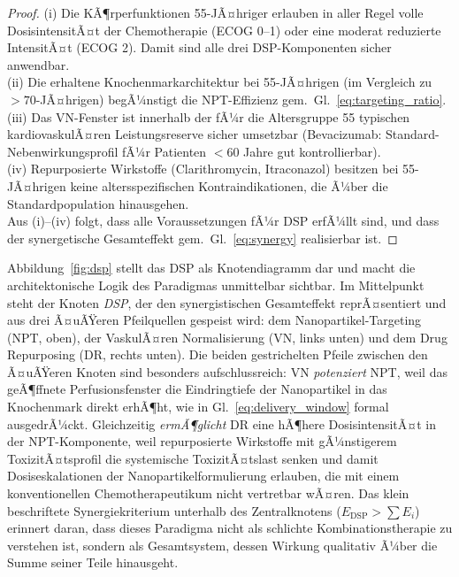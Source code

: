 ﻿\documentclass[12pt,a4paper]{article}
\theoremstyle{definition}
\begin{document}
\begin{proof}
  (i) Die KÃ¶rperfunktionen 55-JÃ¤hriger erlauben in aller Regel volle DosisintensitÃ¤t
  der Chemotherapie (ECOG 0--1) oder eine moderat reduzierte IntensitÃ¤t (ECOG 2).
  Damit sind alle drei DSP-Komponenten sicher anwendbar.\\
  (ii) Die erhaltene Knochenmarkarchitektur bei 55-JÃ¤hrigen (im Vergleich zu
  $>70$-JÃ¤hrigen) begÃ¼nstigt die NPT-Effizienz gem.\ Gl.~\eqref{eq:targeting_ratio}.\\
  (iii) Das VN-Fenster ist innerhalb der fÃ¼r die Altersgruppe 55 typischen kardiovaskulÃ¤ren
  Leistungsreserve sicher umsetzbar (Bevacizumab: Standard-Nebenwirkungsprofil fÃ¼r
  Patienten $<60$ Jahre gut kontrollierbar).\\
  (iv) Repurposierte Wirkstoffe (Clarithromycin, Itraconazol) besitzen bei 55-JÃ¤hrigen
  keine altersspezifischen Kontraindikationen, die Ã¼ber die Standardpopulation
  hinausgehen.\\
  Aus (i)--(iv) folgt, dass alle Voraussetzungen fÃ¼r DSP erfÃ¼llt sind, und dass
  der synergetische Gesamteffekt gem.\ Gl.~\eqref{eq:synergy} realisierbar ist.

\end{proof}

Abbildung~\ref{fig:dsp} stellt das DSP als Knotendiagramm dar und macht die
architektonische Logik des Paradigmas unmittelbar sichtbar. Im Mittelpunkt steht
der Knoten \emph{DSP}, der den synergistischen Gesamteffekt reprÃ¤sentiert und
aus drei Ã¤uÃŸeren Pfeilquellen gespeist wird: dem Nanopartikel-Targeting (NPT, oben),
der VaskulÃ¤ren Normalisierung (VN, links unten) und dem Drug Repurposing (DR, rechts
unten). Die beiden gestrichelten Pfeile zwischen den Ã¤uÃŸeren Knoten sind besonders
aufschlussreich: VN \emph{potenziert} NPT, weil das geÃ¶ffnete Perfusionsfenster
die Eindringtiefe der Nanopartikel in das Knochenmark direkt erhÃ¶ht, wie in
Gl.~\eqref{eq:delivery_window} formal ausgedrÃ¼ckt. Gleichzeitig \emph{ermÃ¶glicht}
DR eine hÃ¶here DosisintensitÃ¤t in der NPT-Komponente, weil repurposierte Wirkstoffe
mit gÃ¼nstigerem ToxizitÃ¤tsprofil die systemische ToxizitÃ¤tslast senken und damit
Dosiseskalationen der Nanopartikelformulierung erlauben, die mit einem konventionellen
Chemotherapeutikum nicht vertretbar wÃ¤ren. Das klein beschriftete Synergiekriterium
unterhalb des Zentralknotens ($E_{\mathrm{DSP}} > \sum E_i$) erinnert daran, dass
dieses Paradigma nicht als schlichte Kombinationstherapie zu verstehen ist, sondern
als Gesamtsystem, dessen Wirkung qualitativ Ã¼ber die Summe seiner Teile hinausgeht.
\end{document}
